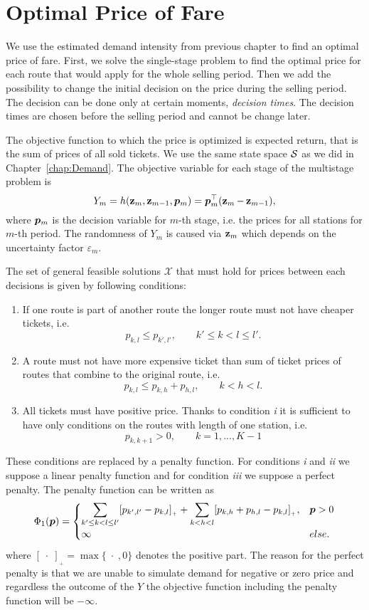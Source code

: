 \chapter{Optimal Price of Fare}
	\label{chap:optimalPrice}
	
We use the estimated demand intensity from previous chapter to find an optimal price of fare. First, we solve the single-stage problem to find the optimal price for each route that would apply for the whole selling period. Then we add the possibility to change the initial decision on the price during the selling period. The decision can be done only at certain moments, \emph{decision times}. The decision times are chosen before the selling period and cannot be change later.

The objective function to which the price is optimized is expected return, that is the sum of prices of all sold tickets. We use the same state space $\S$ as we did in Chapter~\ref{chap:Demand}. The objective variable for each stage of the multistage problem is
\[
	Y_m = h (\z_m, \z_{m-1}, \m{p}_{m}) = \m{p}_{m}^{\top} (\z_m - \z_{m-1}),
\]
where $\m{p}_m$ is the decision variable for $m$-th stage, i.e. the prices for all stations for $m$-th period. The randomness of $Y_m$ is caused via $\z_m$ which depends on the uncertainty factor $\varepsilon_m$.

The set of general feasible solutions $\mathcal{X}$ that must hold for prices between each decisions is given by following conditions:
\begin{enumerate}[\itshape i)]
	\item If one route is part of another route the longer route must not have cheaper tickets, i.e.
		\[
			p_{k,l} \leq p_{k',l'}, \qquad k' \leq k < l \leq l'.
		\]
	
	\item A route must not have more expensive ticket than sum of ticket prices of routes that combine to the original route, i.e.
		\[
			p_{k,l} \leq p_{k,h} + p_{h,l}, \qquad k < h < l.
		\]
	
	\item All tickets must have positive price. Thanks to condition \textit{i} it is sufficient to have only conditions on the routes with length of one station, i.e.
		\[
			p_{k,k+1} > 0, \qquad k = 1, ..., K-1
		\]
\end{enumerate}
These conditions are replaced by a penalty function. For conditions \textit{i} and \textit{ii} we suppose a linear penalty function and for condition \textit{iii} we suppose a perfect penalty. The penalty function can be written as
\[
	\Phi_1 (\m{p}) = \begin{cases}
			\displaystyle{\sum_{k' \leq k < l \leq l'}} [p_{k',l'} - p_{k,l}]_{_{+}} + \displaystyle{\sum_{k < h < l}} [p_{k,h} + p_{h,l} - p_{k,l}]_{_{+}}, & \m{p} > 0 \\
			\infty & else.
		\end{cases}
\]
where $[\; \cdot \;]_{_{+}} = \max\{ \; \cdot \; , 0 \}$ denotes the positive part. The reason for the perfect penalty is that we are unable to simulate demand for negative or zero price and regardless the outcome of the $Y$ the objective function including the penalty function will be $-\infty$.

